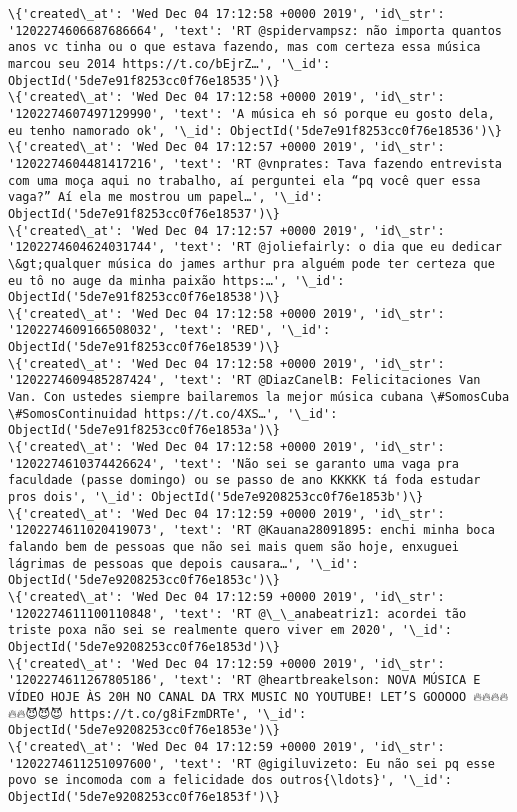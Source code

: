 \documentclass[11pt]{article}
\begin{document}
\begin{Verbatim}[commandchars=\\\{\}]
\{'created\_at': 'Wed Dec 04 17:12:58 +0000 2019', 'id\_str': '1202274606687686664', 'text': 'RT @spidervampsz: não importa quantos anos vc tinha ou o que estava fazendo, mas com certeza essa música marcou seu 2014 https://t.co/bEjrZ…', '\_id': ObjectId('5de7e91f8253cc0f76e18535')\}
\{'created\_at': 'Wed Dec 04 17:12:58 +0000 2019', 'id\_str': '1202274607497129990', 'text': 'A música eh só porque eu gosto dela, eu tenho namorado ok', '\_id': ObjectId('5de7e91f8253cc0f76e18536')\}
\{'created\_at': 'Wed Dec 04 17:12:57 +0000 2019', 'id\_str': '1202274604481417216', 'text': 'RT @vnprates: Tava fazendo entrevista com uma moça aqui no trabalho, aí perguntei ela “pq você quer essa vaga?” Aí ela me mostrou um papel…', '\_id': ObjectId('5de7e91f8253cc0f76e18537')\}
\{'created\_at': 'Wed Dec 04 17:12:57 +0000 2019', 'id\_str': '1202274604624031744', 'text': 'RT @joliefairly: o dia que eu dedicar \&gt;qualquer música do james arthur pra alguém pode ter certeza que eu tô no auge da minha paixão https:…', '\_id': ObjectId('5de7e91f8253cc0f76e18538')\}
\{'created\_at': 'Wed Dec 04 17:12:58 +0000 2019', 'id\_str': '1202274609166508032', 'text': 'RED', '\_id': ObjectId('5de7e91f8253cc0f76e18539')\}
\{'created\_at': 'Wed Dec 04 17:12:58 +0000 2019', 'id\_str': '1202274609485287424', 'text': 'RT @DiazCanelB: Felicitaciones Van Van. Con ustedes siempre bailaremos la mejor música cubana \#SomosCuba \#SomosContinuidad https://t.co/4XS…', '\_id': ObjectId('5de7e91f8253cc0f76e1853a')\}
\{'created\_at': 'Wed Dec 04 17:12:58 +0000 2019', 'id\_str': '1202274610374426624', 'text': 'Não sei se garanto uma vaga pra faculdade (passe domingo) ou se passo de ano KKKKK tá foda estudar pros dois', '\_id': ObjectId('5de7e9208253cc0f76e1853b')\}
\{'created\_at': 'Wed Dec 04 17:12:59 +0000 2019', 'id\_str': '1202274611020419073', 'text': 'RT @Kauana28091895: enchi minha boca falando bem de pessoas que não sei mais quem são hoje, enxuguei lágrimas de pessoas que depois causara…', '\_id': ObjectId('5de7e9208253cc0f76e1853c')\}
\{'created\_at': 'Wed Dec 04 17:12:59 +0000 2019', 'id\_str': '1202274611100110848', 'text': 'RT @\_\_anabeatriz1: acordei tão triste poxa não sei se realmente quero viver em 2020', '\_id': ObjectId('5de7e9208253cc0f76e1853d')\}
\{'created\_at': 'Wed Dec 04 17:12:59 +0000 2019', 'id\_str': '1202274611267805186', 'text': 'RT @heartbreakelson: NOVA MÚSICA E VÍDEO HOJE ÀS 20H NO CANAL DA TRX MUSIC NO YOUTUBE! LET’S GOOOOO 🔥🔥🔥🔥🔥🔥😈😈😈 https://t.co/g8iFzmDRTe', '\_id': ObjectId('5de7e9208253cc0f76e1853e')\}
\{'created\_at': 'Wed Dec 04 17:12:59 +0000 2019', 'id\_str': '1202274611251097600', 'text': 'RT @gigiluvizeto: Eu não sei pq esse povo se incomoda com a felicidade dos outros{\ldots}', '\_id': ObjectId('5de7e9208253cc0f76e1853f')\}

\end{Verbatim}
\end{document}
